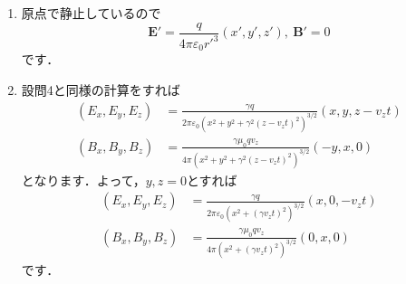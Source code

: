 \documentclass[a4paper,pdflatex,ja=standard]{bxjsarticle}
\begin{document}
\begin{enumerate}
  \item 

  原点で静止しているので
  \begin{equation}
    \bm{E}'
    =
    \frac{q}{4\pi \varepsilon_0 {r'}^3}(x',y',z')
    ,\ 
    \bm{B}'
    =
    0
  \end{equation}
  です．

  
  \item 

  設問4と同様の計算をすれば
  \begin{align}
    (E_x,E_y,E_z)
    &=
    \frac{\gamma q}{2\pi\varepsilon_0 (x^2+y^2+\gamma^2(z-v_zt)^2)^{3/2}}
    \left(  
      x
      ,
      y
      ,
      z-v_zt
    \right)
    \nonumber
    \\
    (B_x,B_y,B_z)
    &=
    \frac{\gamma\mu_0qv_z}{4\pi(x^2+y^2+\gamma^2(z-v_z t)^2)^{3/2}}
    \left(   
      -y
      ,
      x
      ,
      0
    \right)
  \end{align}
  となります．よって，$y,z=0$とすれば
  \begin{align}
    (E_x,E_y,E_z)
    &=
    \frac{\gamma q}{2\pi\varepsilon_0 (x^2+(\gamma v_zt)^2)^{3/2}}
    \left(  
      x
      ,
      0
      ,
      -v_zt
    \right)
    \nonumber
    \\
    (B_x,B_y,B_z)
    &=
    \frac{\gamma\mu_0qv_z}{4\pi(x^2+(\gamma v_z t)^2)^{3/2}}
    \left(   
      0
      ,
      x
      ,
      0
    \right)
  \end{align}
  です．

\end{enumerate}
\end{document}
